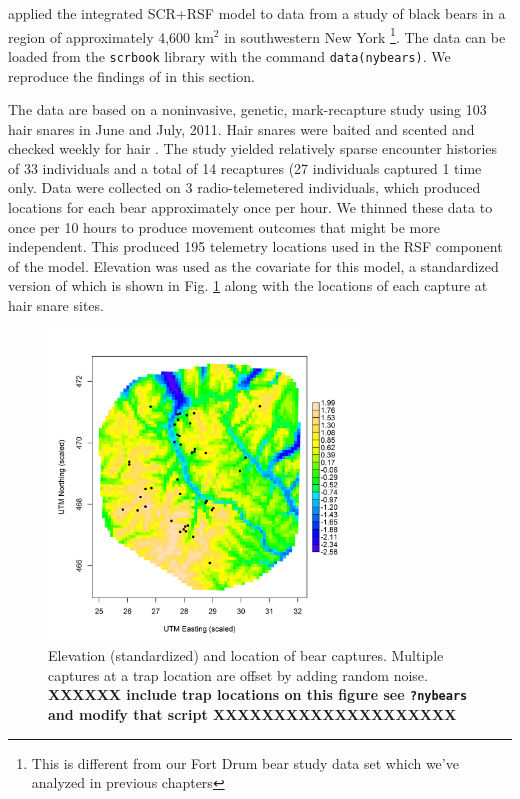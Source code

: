 \citet{royle_etal:2012mee} applied the integrated SCR+RSF model to
data from a study of black bears in a region of approximately 4,600
km$^2$ in southwestern New York \citep{sun:2013}\footnote{This is
different from our Fort Drum bear study data set which we've analyzed
in previous chapters}.  The data can be loaded from the \mbox{\tt scrbook}
library with the command \mbox{\tt data(nybears)}.
We reproduce the findings of \citet{royle_etal:2012mee} in this section.

The data are based on a noninvasive, genetic, mark-recapture study
using 103 hair snares in June and July, 2011.  Hair snares were baited
and scented and checked weekly for hair \citep{sun:2013}.  The study
yielded relatively sparse encounter histories
 of 33 individuals and a total of 14 recaptures (27
individuals captured 1 time only.
Data were collected on 3 radio-telemetered individuals, which produced
locations for each bear approximately once per hour.  We 
thinned these data to once per 10 hours to produce movement outcomes that might
be more independent. This produced 195 telemetry locations used in the
RSF component of the model.   Elevation was used as the covariate for this 
model, a standardized version of which is shown in
Fig. \ref{fig.elevation} along with the locations of each
capture at hair snare sites.   %


\begin{figure}
\centering
\includegraphics[width=3.25in,height=3.25in]{Ch13-RSF/figs/elev_captures2.png}
\caption{
Elevation (standardized) and location of bear captures.
Multiple captures at a trap location are offset by adding
random noise.
{\bf XXXXXX include trap locations on this figure
see \mbox{\tt ?nybears} and modify that script  XXXXXXXXXXXXXXXXXXXX}
}
\label{fig.elevation}
\end{figure}

